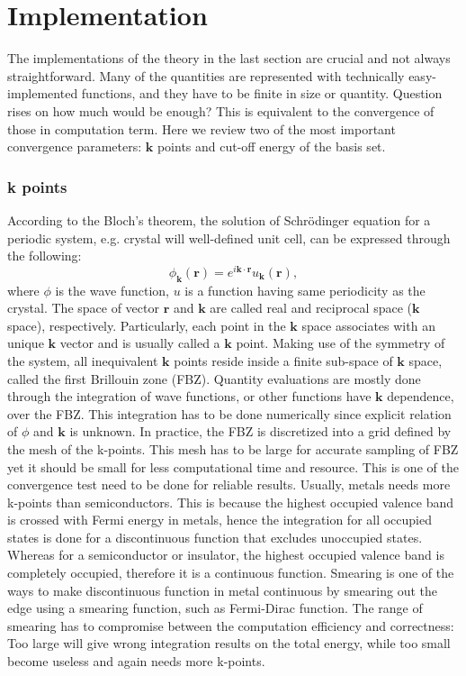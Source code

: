 \section{Implementation}
The implementations of the theory in the last section are crucial and not always straightforward. Many of the quantities are represented with technically easy-implemented functions, and they have to be finite in size or quantity. Question rises on how much would be enough? This is equivalent to the convergence of those in computation term. Here we review two of the most important convergence parameters: $\mathbf{k}$ points and cut-off energy of the basis set.
\subsubsection{k points}
According to the Bloch's theorem, the solution of Schr\"{o}dinger equation for a periodic system, e.g. crystal will well-defined unit cell, can be expressed through the  following:
\begin{equation}\label{imp:bloch}
\phi_{\mathbf{k}}(\mathbf{r})=e^{i\mathbf{k}\cdot\mathbf{r}}u_{\mathbf{k}}(\mathbf{r}),
\end{equation}
where $\phi$ is the wave function, $u$ is a function having same periodicity as the crystal. The space of vector $\mathbf{r}$ and $\mathbf{k}$ are called real and reciprocal space ($\mathbf{k}$ space), respectively. Particularly, each point in the $\mathbf{k}$ space associates with an unique $\mathbf{k}$ vector and is usually called a $\mathbf{k}$ point. Making use of the symmetry of the system, all inequivalent $\mathbf{k}$ points reside inside a finite sub-space of $\mathbf{k}$ space, called the first Brillouin zone (FBZ). Quantity evaluations are mostly done through the integration of wave functions, or other functions have $\mathbf{k}$ dependence, over the FBZ. This integration has to be done numerically since explicit relation of $\phi$ and $\mathbf{k}$ is unknown. In practice, the FBZ is discretized into a grid defined by the mesh of the k-points. This mesh has to be large for accurate sampling of FBZ yet it should be small for less computational time and resource. This is one of the convergence test need to be done for reliable results. Usually, metals needs more k-points than semiconductors. This is because the highest occupied valence band is crossed with Fermi energy in metals, hence the integration for all occupied states is done for a discontinuous function that excludes unoccupied states.  Whereas for a semiconductor or insulator, the highest occupied valence band is completely occupied, therefore it is a continuous function. Smearing is one of the ways to make discontinuous function in metal continuous by smearing out the edge using a smearing function, such as Fermi-Dirac function. The range of smearing has to compromise between the computation efficiency and correctness: Too large will give wrong integration results on the total energy, while too small become useless and again needs more k-points.
